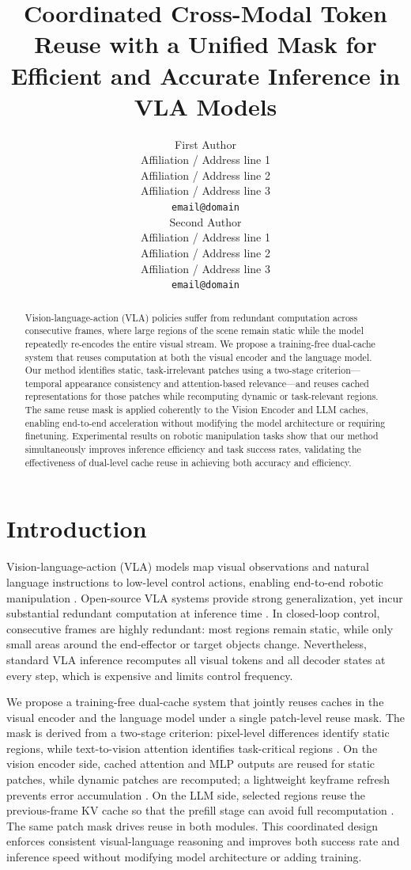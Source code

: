 \documentclass[11pt]{article}
\title{Coordinated Cross-Modal Token Reuse with a Unified Mask for Efficient and Accurate Inference in VLA Models}
\author{First Author \\
  Affiliation / Address line 1 \\
  Affiliation / Address line 2 \\
  Affiliation / Address line 3 \\
  \texttt{email@domain} \\ \And
  Second Author \\
  Affiliation / Address line 1 \\
  Affiliation / Address line 2 \\
  Affiliation / Address line 3 \\
  \texttt{email@domain} \\}
\begin{document}
\maketitle
\begin{abstract}
Vision-language-action (VLA) policies suffer from redundant computation across consecutive frames, where large regions of the scene remain static while the model repeatedly re-encodes the entire visual stream. We propose a training-free dual-cache system that reuses computation at both the visual encoder and the language model. Our method identifies static, task-irrelevant patches using a two-stage criterion---temporal appearance consistency and attention-based relevance---and reuses cached representations for those patches while recomputing dynamic or task-relevant regions. The same reuse mask is applied coherently to the Vision Encoder and LLM caches, enabling end-to-end acceleration without modifying the model architecture or requiring finetuning. Experimental results on robotic manipulation tasks show that our method simultaneously improves inference efficiency and task success rates, validating the effectiveness of dual-level cache reuse in achieving both accuracy and efficiency.
\end{abstract}

\section{Introduction}
Vision-language-action (VLA) models map visual observations and natural language instructions to low-level control actions, enabling end-to-end robotic manipulation \citep{zitkovich2023rt,octo_2023,kim24openvla,black2024pi_0}. Open-source VLA systems provide strong generalization, yet incur substantial redundant computation at inference time \citep{liu2024robomamba,wen2024tinyvla,DeeR-VLA}. In closed-loop control, consecutive frames are highly redundant: most regions remain static, while only small areas around the end-effector or target objects change. Nevertheless, standard VLA inference recomputes all visual tokens and all decoder states at every step, which is expensive and limits control frequency.

We propose a training-free dual-cache system that jointly reuses caches in the visual encoder and the language model under a single patch-level reuse mask. The mask is derived from a two-stage criterion: pixel-level differences identify static regions, while text-to-vision attention identifies task-critical regions \citep{xu2025vla}. On the vision encoder side, cached attention and MLP outputs are reused for static patches, while dynamic patches are recomputed; a lightweight keyframe refresh prevents error accumulation \citep{liu2025ttf}. On the LLM side, selected regions reuse the previous-frame KV cache so that the prefill stage can avoid full recomputation \citep{xu2025vla}. The same patch mask drives reuse in both modules. This coordinated design enforces consistent visual-language reasoning and improves both success rate and inference speed without modifying model architecture or adding training.
\end{document}
